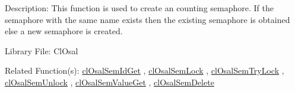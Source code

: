 \begin{Desc}
\item[Description:]This function is used to create an counting semaphore. If the semaphore with the same name exists then the existing semaphore is obtained else a new semaphore is created.\end{Desc}
\begin{Desc}
\item[Library File:]Cl\-Osal\end{Desc}
\begin{Desc}
\item[Related Function(s):]\hyperlink{pageosal133}{cl\-Osal\-Sem\-Id\-Get} , \hyperlink{pageosal134}{cl\-Osal\-Sem\-Lock} , 
\hyperlink{pageosal135}{cl\-Osal\-Sem\-Try\-Lock} , \hyperlink{pageosal136}{cl\-Osal\-Sem\-Unlock} , 
\hyperlink{pageosal137}{cl\-Osal\-Sem\-Value\-Get} , \hyperlink{pageosal138}{cl\-Osal\-Sem\-Delete} \end{Desc}

\newpage
